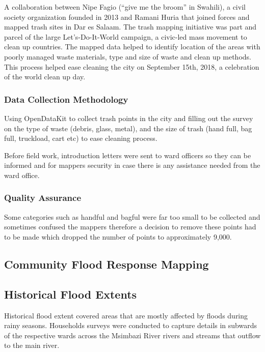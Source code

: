 \documentclass[a4paper,12pt,twoside]{article}
\begin{document}
A collaboration between Nipe Fagio (“give me the broom” in Swahili), a civil society organization founded in 2013 and Ramani Huria that joined forces and mapped trash sites in Dar es Salaam. The trash mapping initiative was part and parcel of the large Let’s-Do-It-World campaign, a civic-led mass movement to clean up countries.
The mapped data helped to identify location of the areas with poorly managed waste materials, type and size of waste and clean up methods. This process helped ease cleaning the city on September 15th, 2018, a celebration of the world clean up day.

\subsubsection{Data Collection Methodology}
Using OpenDataKit to collect trash points in the city and filling out the survey on the type of waste (debris, glass, metal), and the size of trash (hand full, bag full, truckload, cart etc) to ease cleaning process.

Before field work, introduction letters were sent to ward officers so they can be informed and for mappers security in case there is any assistance needed from the ward office.

\subsubsection{Quality Assurance}
Some categories such as handful and bagful were far too small to be collected and sometimes confused the mappers therefore a decision to remove these points had to be made which dropped the number of points to approximately 9,000.

\newpage
\subsection{Community Flood Response Mapping}

\newpage
\subsection{Historical Flood Extents}

Historical flood extent covered areas that are mostly affected by floods during rainy seasons. Households surveys were conducted to capture details in  subwards of the respective wards across the Msimbazi River rivers and streams that outflow to the main river.

\medskip
\end{document}
